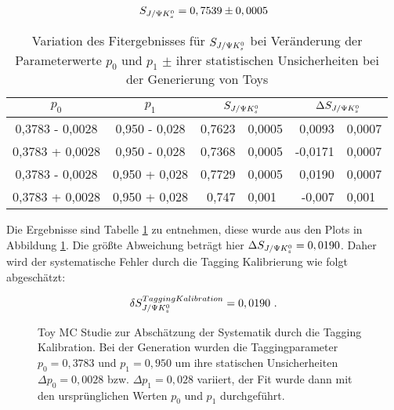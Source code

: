 \begin{align}
S_{J/\Psi K_s^0} = 0,7539 \pm 0,0005
\end{align}

\begin{table}[hptb]
\centering
\caption{Variation des Fitergebnisses für $S_{J/\Psi K_s^0}$ bei Veränderung der Parameterwerte $p_0$ und $p_1$ $\pm$ ihrer statistischen Unsicherheiten bei der Generierung von Toys}
\label{tab:syst_fit_calib_toys}
\begin{tabular}{cc|r@{$\pm$}l|r@{$\pm$}l}
\hline\hline
$p_0$  &  $p_1$  &  \multicolumn{2}{c}{$S_{J/\Psi K_s^0}$}  & \multicolumn{2}{c}{$\Delta S_{J/\Psi K_s^0}$}   \\ \hline
0,3783 - 0,0028  &  0,950 - 0,028  &  0,7623 & 0,0005  &   0,0093 & 0,0007 \\
0,3783 + 0,0028  &  0,950 - 0,028  &  0,7368 & 0,0005  &  -0,0171 & 0,0007 \\
0,3783 - 0,0028  &  0,950 + 0,028  &  0,7729 & 0,0005  &   0,0190 & 0,0007 \\
0,3783 + 0,0028  &  0,950 + 0,028  &  0,747  & 0,001   &  -0,007  & 0,001 \\
\hline\hline
\end{tabular}
\end{table}

Die Ergebnisse sind Tabelle \ref{tab:syst_fit_calib_toys} zu entnehmen, diese wurde aus den Plots in Abbildung \ref{fig:toys_tag_calib}. Die größte Abweichung beträgt hier $\Delta S_{J/\Psi K_s^0} = 0,0190$. Daher wird der systematische Fehler durch die Tagging Kalibrierung wie folgt abgeschätzt:

\begin{align}
\delta S_{J/\Psi K_s^0}^{Tagging Kalibration} = 0,0190 \ .
\end{align}

\begin{figure}[hptb]
\caption{Toy MC Studie zur Abschätzung der Systematik durch die Tagging Kalibration. Bei der Generation wurden die Taggingparameter $p_0=0,3783$ und $p_1=0,950$ um ihre statischen Unsicherheiten $\Delta p_0 = 0,0028$ bzw. $\Delta p_1 = 0,028$ variiert, der Fit wurde dann mit den ursprünglichen Werten $p_0$ und $p_1$ durchgeführt.}
\label{fig:toys_tag_calib}
\end{figure}



